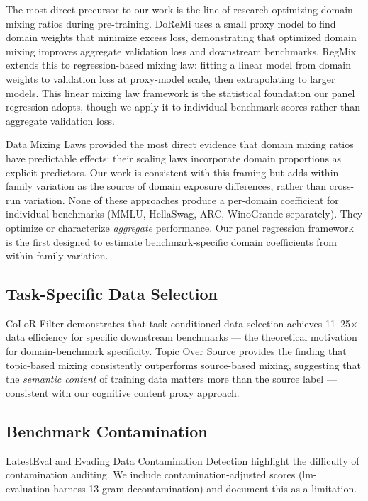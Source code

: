 The most direct precursor to our work is the line of research optimizing domain mixing ratios during pre-training. DoReMi \cite{DoReMi2023} uses a small proxy model to find domain weights that minimize excess loss, demonstrating that optimized domain mixing improves aggregate validation loss and downstream benchmarks. RegMix \cite{Liu2024RegMix} extends this to regression-based mixing law: fitting a linear model from domain weights to validation loss at proxy-model scale, then extrapolating to larger models. This linear mixing law framework is the statistical foundation our panel regression adopts, though we apply it to individual benchmark scores rather than aggregate validation loss.

Data Mixing Laws \cite{Ye2024DataMixingLaws} provided the most direct evidence that domain mixing ratios have predictable effects: their scaling laws incorporate domain proportions as explicit predictors. Our work is consistent with this framing but adds within-family variation as the source of domain exposure differences, rather than cross-run variation. None of these approaches produce a per-domain coefficient for individual benchmarks (MMLU, HellaSwag, ARC, WinoGrande separately). They optimize or characterize \textit{aggregate} performance. Our panel regression framework is the first designed to estimate benchmark-specific domain coefficients from within-family variation.

\subsection{Task-Specific Data Selection}

CoLoR-Filter \cite{Brandfonbrener2024CoLoR} demonstrates that task-conditioned data selection achieves 11--25$\times$ data efficiency for specific downstream benchmarks --- the theoretical motivation for domain-benchmark specificity. Topic Over Source \cite{Peng2025TopicOverSource} provides the finding that topic-based mixing consistently outperforms source-based mixing, suggesting that the \textit{semantic content} of training data matters more than the source label --- consistent with our cognitive content proxy approach.

\subsection{Benchmark Contamination}

LatestEval \cite{Li2023LatestEval} and Evading Data Contamination Detection \cite{Dekoninck2024Evading} highlight the difficulty of contamination auditing. We include contamination-adjusted scores (lm-evaluation-harness 13-gram decontamination) and document this as a limitation.

